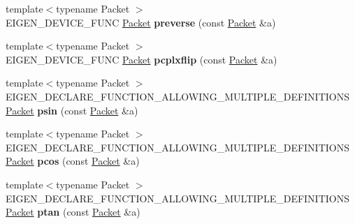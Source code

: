 \begin{DoxyCompactItemize}
\item 
\mbox{\label{namespace_eigen_1_1internal_ad68395462f0b2bcad95267e6259f70ea}} 
{\footnotesize template$<$typename Packet $>$ }\\E\+I\+G\+E\+N\+\_\+\+D\+E\+V\+I\+C\+E\+\_\+\+F\+U\+NC \hyperlink{union_eigen_1_1internal_1_1_packet}{Packet} {\bfseries preverse} (const \hyperlink{union_eigen_1_1internal_1_1_packet}{Packet} \&a)
\item 
\mbox{\label{namespace_eigen_1_1internal_abf345f2bb58906567bb9355054af43d4}} 
{\footnotesize template$<$typename Packet $>$ }\\E\+I\+G\+E\+N\+\_\+\+D\+E\+V\+I\+C\+E\+\_\+\+F\+U\+NC \hyperlink{union_eigen_1_1internal_1_1_packet}{Packet} {\bfseries pcplxflip} (const \hyperlink{union_eigen_1_1internal_1_1_packet}{Packet} \&a)
\item 
\mbox{\label{namespace_eigen_1_1internal_a63fe77ca10d5855dc46d495d24d1c49b}} 
{\footnotesize template$<$typename Packet $>$ }\\E\+I\+G\+E\+N\+\_\+\+D\+E\+C\+L\+A\+R\+E\+\_\+\+F\+U\+N\+C\+T\+I\+O\+N\+\_\+\+A\+L\+L\+O\+W\+I\+N\+G\+\_\+\+M\+U\+L\+T\+I\+P\+L\+E\+\_\+\+D\+E\+F\+I\+N\+I\+T\+I\+O\+NS \hyperlink{union_eigen_1_1internal_1_1_packet}{Packet} {\bfseries psin} (const \hyperlink{union_eigen_1_1internal_1_1_packet}{Packet} \&a)
\item 
\mbox{\label{namespace_eigen_1_1internal_a543f7e636fc50680d1f3c4d54b495594}} 
{\footnotesize template$<$typename Packet $>$ }\\E\+I\+G\+E\+N\+\_\+\+D\+E\+C\+L\+A\+R\+E\+\_\+\+F\+U\+N\+C\+T\+I\+O\+N\+\_\+\+A\+L\+L\+O\+W\+I\+N\+G\+\_\+\+M\+U\+L\+T\+I\+P\+L\+E\+\_\+\+D\+E\+F\+I\+N\+I\+T\+I\+O\+NS \hyperlink{union_eigen_1_1internal_1_1_packet}{Packet} {\bfseries pcos} (const \hyperlink{union_eigen_1_1internal_1_1_packet}{Packet} \&a)
\item 
\mbox{\label{namespace_eigen_1_1internal_a7020b6f031cfbe6718312af7849a3971}} 
{\footnotesize template$<$typename Packet $>$ }\\E\+I\+G\+E\+N\+\_\+\+D\+E\+C\+L\+A\+R\+E\+\_\+\+F\+U\+N\+C\+T\+I\+O\+N\+\_\+\+A\+L\+L\+O\+W\+I\+N\+G\+\_\+\+M\+U\+L\+T\+I\+P\+L\+E\+\_\+\+D\+E\+F\+I\+N\+I\+T\+I\+O\+NS \hyperlink{union_eigen_1_1internal_1_1_packet}{Packet} {\bfseries ptan} (const \hyperlink{union_eigen_1_1internal_1_1_packet}{Packet} \&a)

\end{DoxyCompactItemize}
